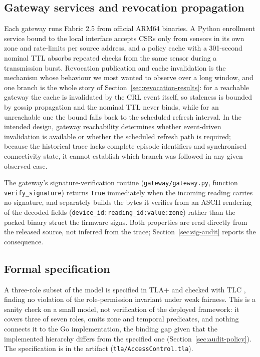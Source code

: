 \subsection{Gateway services and revocation propagation}

Each gateway runs Fabric 2.5 from official ARM64 binaries. A Python enrollment service bound to the local interface accepts CSRs only from sensors in its own zone and rate-limits per source address, and a policy cache with a 301-second nominal TTL absorbs repeated checks from the same sensor during a transmission burst. Revocation publication and cache invalidation is the mechanism whose behaviour we most wanted to observe over a long window, and one branch is the whole story of Section~\ref{sec:revocation-results}: for a reachable gateway the cache is invalidated by the CRL event itself, so staleness is bounded by gossip propagation and the nominal TTL never binds, while for an unreachable one the bound falls back to the scheduled refresh interval. In the intended design, gateway reachability determines whether event-driven invalidation is available or whether the scheduled refresh path is required; because the historical trace lacks complete episode identifiers and synchronised connectivity state, it cannot establish which branch was followed in any given observed case.

The gateway's signature-verification routine (\texttt{gateway/gateway.py}, function \texttt{verify\_signature}) returns \texttt{True} immediately when the incoming reading carries no signature, and separately builds the bytes it verifies from an ASCII rendering of the decoded fields (\texttt{device\_id:reading\_id:value:zone}) rather than the packed binary struct the firmware signs. Both properties are read directly from the released source, not inferred from the trace; Section~\ref{sec:sig-audit} reports the consequence.

\subsection{Formal specification}

A three-role subset of the model is specified in TLA+ and checked with TLC \citep{lamport2002specifying,newcombe2015how}, finding no violation of the role-permission invariant under weak fairness. This is a sanity check on a small model, not verification of the deployed framework: it covers three of seven roles, omits zone and temporal predicates, and nothing connects it to the Go implementation, the binding gap given that the implemented hierarchy differs from the specified one (Section~\ref{sec:audit-policy}). The specification is in the artifact (\texttt{tla/AccessControl.tla}).

